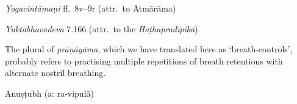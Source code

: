 \begin{ekdosis}

\begin{testimonia}[hp02_038]
\emph{Yogacintāmaṇi} ff.~8v–9r (attr.~to Ātmārāma)

\begin{versinnote}
\end{versinnote}

\emph{Yuktabhavadeva} 7.166 (attr.~to the \emph{Haṭhapradīpikā})

\begin{versinnote}
\end{versinnote}
\end{testimonia}

\begin{philcomm}[hp02_038]
The plural of \emph{prāṇāyāma}, which we have translated here as ‘breath-controls’, probably refers to practising multiple repetitions of breath retentions with alternate nostril breathing. \lb

\end{philcomm}

\begin{metre}[hp02_038]
Anuṣṭubh (a: ra-vipulā)
\end{metre}


\end{ekdosis}

